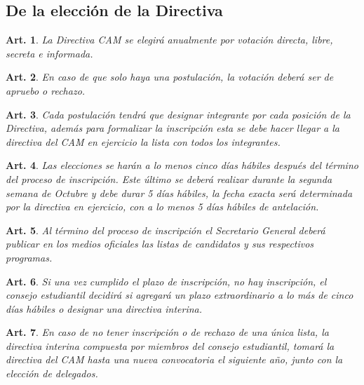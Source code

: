 \documentclass[letterpaper,11pt]{article}
\theoremstyle{plain}
\newtheorem{art}{Art.} %
\begin{document}
\subsection{De la elección de la Directiva}\label{eleccionesCAM}
\begin{art}\label{}
	La Directiva CAM se elegirá anualmente por votación directa, libre, secreta e informada.
\end{art}

\begin{art}\label{eleccionesCAMListaUnica}
	En caso de que solo haya una postulación, la votación deberá ser de apruebo o rechazo. %
\end{art}

\begin{art}\label{eleccionesCAMPostulacion}
	Cada postulación tendrá que designar integrante por cada posición de la Directiva, además para formalizar la inscripción esta se debe hacer llegar a la directiva del CAM en ejercicio la lista con todos los integrantes.
\end{art}

\begin{art}\label{eleccionesCAMFechas}
	Las elecciones se harán a lo menos cinco días hábiles después del término del proceso de inscripción. Este último se deberá realizar durante la segunda semana de Octubre y debe durar 5 días hábiles, la fecha exacta será determinada por la directiva en ejercicio, con a lo menos 5 días hábiles de antelación.
\end{art}

\begin{art}\label{eleccionesCAMPublicacion}
	Al término del proceso de inscripción el Secretario General deberá publicar en los medios oficiales las listas de candidatos y sus respectivos programas.
\end{art}

\begin{art}\label{eleccionesCAMInscripcion}
	Si una vez cumplido el plazo de inscripción, no hay inscripción, el consejo estudiantil decidirá si agregará un plazo extraordinario a lo más de cinco días hábiles o designar una directiva interina.
\end{art}

\begin{art}\label{eleccionesCAMFalla}
	En caso de no tener inscripción o de rechazo de una única lista, la directiva interina compuesta por miembros del consejo estudiantil, tomará la directiva del CAM hasta una nueva convocatoria el siguiente año, junto con la elección de delegados.
\end{art}
\end{document}

